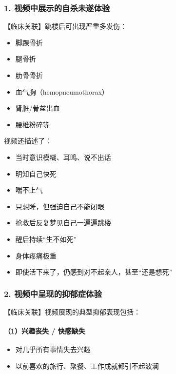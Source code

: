 \documentclass[
  chinese,
  9pt,
  a4paper,
]{ctexart}
\providecommand{\tightlist}{%
  \setlength{\itemsep}{0pt}\setlength{\parskip}{0pt}}
\begin{document}
\subsubsection{1.
视频中展示的自杀未遂体验}\label{ux89c6ux9891ux4e2dux5c55ux793aux7684ux81eaux6740ux672aux9042ux4f53ux9a8c}

【临床关联】跳楼后可出现严重多发伤：

\begin{itemize}
\tightlist
\item
  脚踝骨折
\item
  腿骨折
\item
  肋骨骨折
\item
  血气胸（hemopneumothorax）
\item
  肾脏/骨盆出血
\item
  腰椎粉碎等
\end{itemize}

视频还描述了：

\begin{itemize}
\tightlist
\item
  当时意识模糊、耳鸣、说不出话
\item
  明知自己快死
\item
  喘不上气
\item
  只想睡，但强迫自己不能闭眼
\item
  抢救后反复梦见自己一遍遍跳楼
\item
  醒后持续``生不如死''
\item
  身体疼痛极重
\item
  即使活下来了，仍感到对不起亲人，甚至``还是想死''
\end{itemize}

\subsubsection{2.
视频中呈现的抑郁症体验}\label{ux89c6ux9891ux4e2dux5448ux73b0ux7684ux6291ux90c1ux75c7ux4f53ux9a8c}

【临床关联】视频展现的典型抑郁表现包括：

\paragraph{（1）兴趣丧失 /
快感缺失}\label{ux5174ux8da3ux4e27ux5931-ux5febux611fux7f3aux5931}

\begin{itemize}
\tightlist
\item
  对几乎所有事情失去兴趣
\item
  以前喜欢的旅行、聚餐、工作成就都引不起波澜
\end{itemize}
\end{document}
